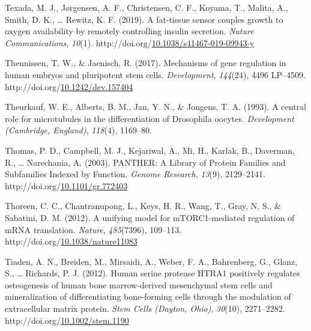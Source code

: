 \documentclass[12pt,oneside]{reedthesis}
\newlength{\cslhangindent}
\newenvironment{CSLReferences}[2] %
 {%
  \setlength{\parindent}{0pt}
  \ifodd #1 \everypar{\setlength{\hangindent}{\cslhangindent}}\ignorespaces\fi
  \ifnum #2 > 0
  \setlength{\parskip}{#2\baselineskip}
  \fi
 }%
 {}
\begin{document}
\begin{CSLReferences}{1}{0}
\leavevmode{}%
Texada, M. J., Jørgensen, A. F., Christensen, C. F., Koyama, T., Malita, A., Smith, D. K., \ldots{} Rewitz, K. F. (2019). A fat-tissue sensor couples growth to oxygen availability by remotely controlling insulin secretion. \emph{Nature Communications}, \emph{10}(1). http://doi.org/\href{https://doi.org/10.1038/s41467-019-09943-y}{10.1038/s41467-019-09943-y}

\leavevmode{}%
Theunissen, T. W., \& Jaenisch, R. (2017). Mechanisms of gene regulation in human embryos and pluripotent stem cells. \emph{Development}, \emph{144}(24), 4496 LP--4509. http://doi.org/\href{https://doi.org/10.1242/dev.157404}{10.1242/dev.157404}

\leavevmode{}%
Theurkauf, W. E., Alberts, B. M., Jan, Y. N., \& Jongens, T. A. (1993). A central role for microtubules in the differentiation of {Drosophila} oocytes. \emph{Development (Cambridge, England)}, \emph{118}(4), 1169--80.

\leavevmode{}%
Thomas, P. D., Campbell, M. J., Kejariwal, A., Mi, H., Karlak, B., Daverman, R., \ldots{} Narechania, A. (2003). {PANTHER}: {A Library} of {Protein Families} and {Subfamilies Indexed} by {Function}. \emph{Genome Research}, \emph{13}(9), 2129--2141. http://doi.org/\href{https://doi.org/10.1101/gr.772403}{10.1101/gr.772403}

\leavevmode{}%
Thoreen, C. C., Chantranupong, L., Keys, H. R., Wang, T., Gray, N. S., \& Sabatini, D. M. (2012). A unifying model for {mTORC1-mediated} regulation of {mRNA} translation. \emph{Nature}, \emph{485}(7396), 109--113. http://doi.org/\href{https://doi.org/10.1038/nature11083}{10.1038/nature11083}

\leavevmode{}%
Tiaden, A. N., Breiden, M., Mirsaidi, A., Weber, F. A., Bahrenberg, G., Glanz, S., \ldots{} Richards, P. J. (2012). Human serine protease {HTRA1} positively regulates osteogenesis of human bone marrow-derived mesenchymal stem cells and mineralization of differentiating bone-forming cells through the modulation of extracellular matrix protein. \emph{Stem Cells (Dayton, Ohio)}, \emph{30}(10), 2271--2282. http://doi.org/\href{https://doi.org/10.1002/stem.1190}{10.1002/stem.1190}


\end{CSLReferences}
\end{document}
